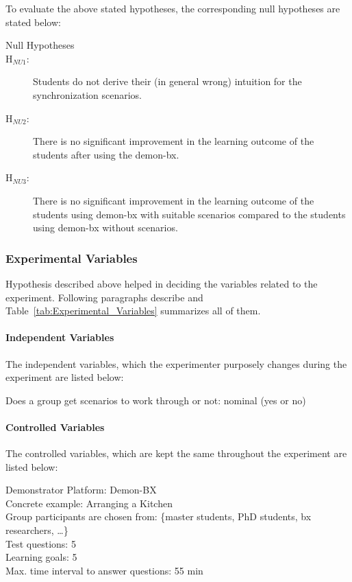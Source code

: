 To evaluate the above stated hypotheses, the corresponding null hypotheses are stated below:
\begin{description}
	\item[Null Hypotheses]
	\item[H$_{NU1}$:] Students do not derive their (in general wrong) intuition for the synchronization scenarios.
	\item[H$_{NU2}$:] There is no significant improvement in the learning outcome of the students after using the demon-bx.
	\item[H$_{NU3}$:] There is no significant improvement in the learning outcome of the students using demon-bx with suitable scenarios compared to the students using demon-bx without scenarios.

\end{description}

\subsubsection{Experimental Variables}\label{subsubsec:expvariables}
Hypothesis described above helped in deciding the variables related to the experiment. Following paragraphs describe and Table~\ref{tab:Experimental_Variables} summarizes all of them.

\paragraph{Independent Variables} The independent variables, which the experimenter purposely changes during the experiment are listed below:

Does a group get scenarios to work through or not: nominal (yes or no)

\paragraph{Controlled Variables} The controlled variables, which are kept the same throughout the experiment are listed below:

Demonstrator Platform: Demon-BX\\
Concrete example: Arranging a Kitchen\\
Group participants are chosen from: \{master students, PhD students, bx researchers, \ldots \}\\
Test questions: 5\\
Learning goals: 5\\
Max. time interval to answer questions: 55 min

